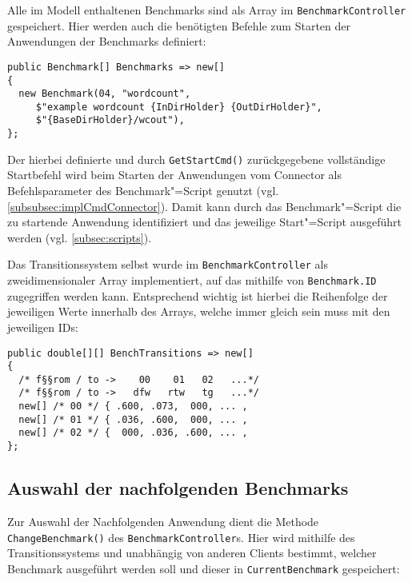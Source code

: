 Alle im Modell enthaltenen Benchmarks sind als Array im \texttt{BenchmarkController} gespeichert.
Hier werden auch die benötigten Befehle zum Starten der Anwendungen der Benchmarks definiert:

\begin{lstlisting}[label=lst:benchmarkDefinition,style=cs,
caption={[Definition der verfügbaren Benchmarks im BenchmarkController]
    Definition der verfügbaren Benchmarks im \texttt{BenchmarkController} (gekürzt)}]
public Benchmark[] Benchmarks => new[]
{
  new Benchmark(04, "wordcount",
     $"example wordcount {InDirHolder} {OutDirHolder}",
     $"{BaseDirHolder}/wcout"),
};
\end{lstlisting}

Der hierbei definierte und durch \texttt{GetStartCmd()} zurückgegebene vollständige Startbefehl wird beim Starten der Anwendungen vom Connector als Befehlsparameter des Benchmark"=Script genutzt (vgl. \cref{subsubsec:implCmdConnector}).
Damit kann durch das Benchmark"=Script die zu startende Anwendung identifiziert und das jeweilige Start"=Script ausgeführt werden (vgl. \cref{subsec:scripts}).

Das Transitionssystem selbst wurde im \texttt{BenchmarkController} als zweidimensionaler Array implementiert, auf das mithilfe von \texttt{Benchmark.ID} zugegriffen werden kann.
Entsprechend wichtig ist hierbei die Reihenfolge der jeweiligen Werte innerhalb des Arrays, welche immer gleich sein muss mit den jeweiligen IDs:

\begin{lstlisting}[label=lst:transitionSystemImpl,style=cs,
caption={[Implementierung des Transitionssystems im BenchmarkController]
    Implementierung des Transitionssystems im \texttt{BenchmarkController} (gekürzt)}]
public double[][] BenchTransitions => new[]
{
  /* f§§rom / to ->    00    01   02   ...*/
  /* f§§rom / to ->   dfw   rtw   tg   ...*/
  new[] /* 00 */ { .600, .073,  000, ... ,
  new[] /* 01 */ { .036, .600,  000, ... ,
  new[] /* 02 */ {  000, .036, .600, ... ,
};
\end{lstlisting}

\subsection{Auswahl der nachfolgenden Benchmarks}
\label{subsec:selectionNextBenchmark}

Zur Auswahl der Nachfolgenden Anwendung dient die Methode \texttt{ChangeBenchmark()} des \texttt{BenchmarkController}s.
Hier wird mithilfe des Transitionssystems und unabhängig von anderen Clients bestimmt, welcher Benchmark ausgeführt werden soll und dieser in \texttt{CurrentBenchmark} gespeichert:

